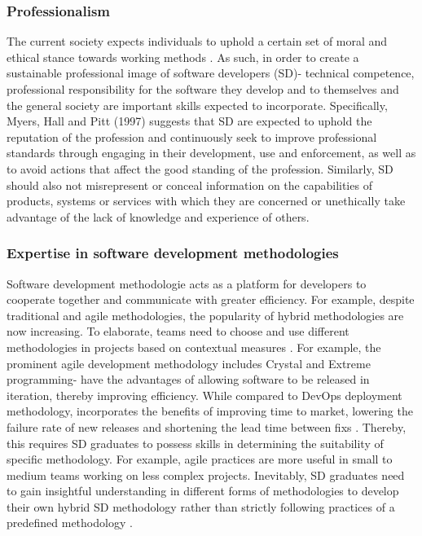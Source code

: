 \documentclass[a4paper, 11pt]{report}
\begin{document}
\subsubsection{Professionalism}
The current society expects individuals to uphold a certain set of moral and ethical stance towards working methods \cite{myers2012responsible}. As such, in order to create a sustainable professional image of software developers (SD)- technical competence, professional responsibility for the software they develop and to themselves and the general society are important skills expected to incorporate. Specifically, Myers, Hall and Pitt (1997) suggests that SD are expected to uphold the reputation of the profession and continuously seek to improve professional standards through engaging in their development, use and enforcement, as well as to avoid actions that affect the good standing of the profession. Similarly, SD should also not misrepresent or conceal information on the capabilities of products, systems or services with which they are concerned or unethically take advantage of the lack of knowledge and experience of others. 
 
\subsubsection{Expertise in software development methodologies}
Software development methodologie acts as a platform for developers to cooperate together and communicate with greater efficiency. For example, despite traditional and agile methodologies, the popularity of hybrid methodologies are now increasing. To elaborate, teams need to choose and use different methodologies in projects based on contextual measures \cite{vijayasarathy2015choice}. For example, the prominent agile development methodology includes Crystal and Extreme programming- have the advantages of allowing software to be released in iteration, thereby improving efficiency. While compared to DevOps deployment methodology, incorporates the benefits of improving time to market, lowering the failure rate of new releases and shortening the lead time between fixs \cite{Synopsys2017}. Thereby, this requires SD graduates to possess skills in determining the suitability of specific methodology. For example, agile practices are more useful in small to medium teams working on less complex projects. Inevitably, SD graduates need to gain insightful understanding in different forms of methodologies to develop their own hybrid SD methodology rather than strictly following practices of a predefined  methodology \cite{williams2010agile}. 
\end{document}

